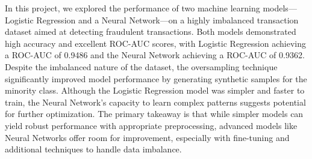 \documentclass[a4, 10 pt, conference]{ieeeconf}  %
\begin{document}
\begin{center}
  \begin{table}[!h]

  \end{table}
\end{center}
In this project, we explored the performance of two machine learning models—Logistic Regression and a Neural Network—on a highly imbalanced transaction dataset aimed at detecting fraudulent transactions.
Both models demonstrated high accuracy and excellent ROC-AUC scores, with Logistic Regression achieving a ROC-AUC of 0.9486 and the Neural Network achieving a ROC-AUC of 0.9362. Despite the imbalanced nature of the dataset,
the oversampling technique significantly improved model performance by generating synthetic samples for the minority class. Although the Logistic Regression model was simpler and faster to train, the Neural Network's capacity to
learn complex patterns suggests potential for further optimization. The primary takeaway is that while simpler models can yield robust performance with appropriate preprocessing, advanced models like Neural Networks offer room for improvement,
especially with fine-tuning and additional techniques to handle data imbalance.
\end{document}
